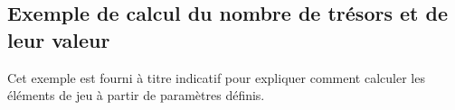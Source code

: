 \documentclass{pirategame}
\begin{document}

\subsection{Exemple de calcul du nombre de trésors et de leur valeur}

Cet exemple est fourni à titre indicatif pour expliquer comment calculer les éléments de jeu à partir de paramètres définis.
\end{document}
